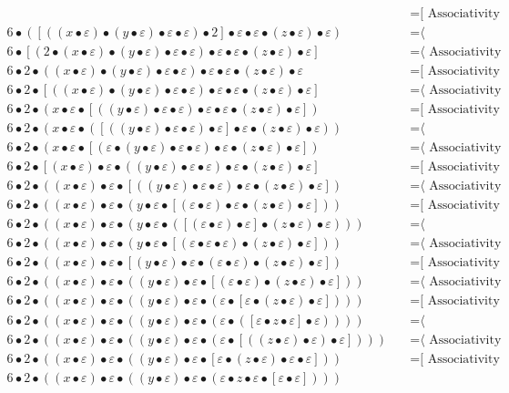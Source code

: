 \documentclass{article}
\begin{document}
\begin{align*}
  & \quad \text{=[ Associativity ⟩}\\
6 • ([((x • ε) • (y • ε) • ε • ε) • 2] • ε • ε • (z • ε) • ε)
  & \quad \text{=⟨ Commutativity ]}\\
6 • [(2 • (x • ε) • (y • ε) • ε • ε) • ε • ε • (z • ε) • ε]
  & \quad \text{=⟨ Associativity ]}\\
6 • 2 • ((x • ε) • (y • ε) • ε • ε) • ε • ε • (z • ε) • ε
  & \quad \text{=[ Associativity ⟩}\\
6 • 2 • [((x • ε) • (y • ε) • ε • ε) • ε • ε • (z • ε) • ε]
  & \quad \text{=⟨ Associativity ]}\\
6 • 2 • (x • ε • [((y • ε) • ε • ε) • ε • ε • (z • ε) • ε])
  & \quad \text{=[ Associativity ⟩}\\
6 • 2 • (x • ε • ([((y • ε) • ε • ε) • ε] • ε • (z • ε) • ε))
  & \quad \text{=⟨ Commutativity ]}\\
6 • 2 • (x • ε • [(ε • (y • ε) • ε • ε) • ε • (z • ε) • ε])
  & \quad \text{=⟨ Associativity ]}\\
6 • 2 • [(x • ε) • ε • ((y • ε) • ε • ε) • ε • (z • ε) • ε]
  & \quad \text{=[ Associativity ⟩}\\
6 • 2 • ((x • ε) • ε • [((y • ε) • ε • ε) • ε • (z • ε) • ε])
  & \quad \text{=⟨ Associativity ]}\\
6 • 2 • ((x • ε) • ε • (y • ε • [(ε • ε) • ε • (z • ε) • ε]))
  & \quad \text{=[ Associativity ⟩}\\
6 • 2 • ((x • ε) • ε • (y • ε • ([(ε • ε) • ε] • (z • ε) • ε)))
  & \quad \text{=⟨ Commutativity ]}\\
6 • 2 • ((x • ε) • ε • (y • ε • [(ε • ε • ε) • (z • ε) • ε]))
  & \quad \text{=⟨ Associativity ]}\\
6 • 2 • ((x • ε) • ε • [(y • ε) • ε • (ε • ε) • (z • ε) • ε])
  & \quad \text{=[ Associativity ⟩}\\
6 • 2 • ((x • ε) • ε • ((y • ε) • ε • [(ε • ε) • (z • ε) • ε]))
  & \quad \text{=⟨ Associativity ]}\\
6 • 2 • ((x • ε) • ε • ((y • ε) • ε • (ε • [ε • (z • ε) • ε])))
  & \quad \text{=[ Associativity ⟩}\\
6 • 2 • ((x • ε) • ε • ((y • ε) • ε • (ε • ([ε • z • ε] • ε))))
  & \quad \text{=⟨ Commutativity ]}\\
6 • 2 • ((x • ε) • ε • ((y • ε) • ε • (ε • [((z • ε) • ε) • ε])))
  & \quad \text{=⟨ Associativity ]}\\
6 • 2 • ((x • ε) • ε • ((y • ε) • ε • [ε • (z • ε) • ε • ε]))
  & \quad \text{=[ Associativity ⟩}\\
6 • 2 • ((x • ε) • ε • ((y • ε) • ε • (ε • z • ε • [ε • ε])))

\end{align*}
\end{document}
